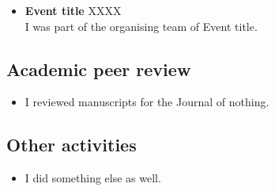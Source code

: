 \documentclass[a4paper,11pt,SidebarWidth=8.6cm]{academic_cv}
\begin{document}
\begin{itemize}[leftmargin=*,itemsep=0pt,parsep=0pt,topsep=0pt]
  \item{\textbf{Event title} XXXX \\ I was part of the organising team of Event title.}
\end{itemize}

\subsection*{Academic peer review}

\begin{itemize}[leftmargin=*,itemsep=0pt,parsep=0pt,topsep=0pt]
  \item{I reviewed manuscripts for the Journal of nothing.}
\end{itemize}

\subsection*{Other activities}

\begin{itemize}[leftmargin=*,itemsep=0pt,parsep=0pt,topsep=0pt]
  \item{I did something else as well.}
\end{itemize}
\end{document}
